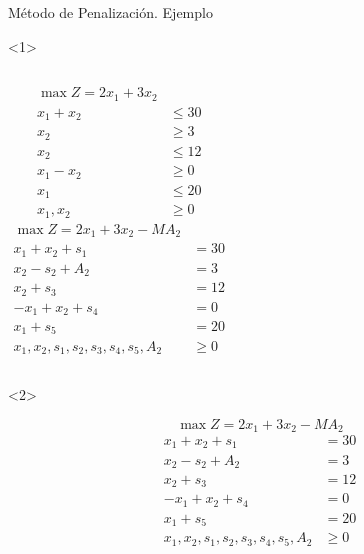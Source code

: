 \begin{frame}{Método de Penalización. Ejemplo}{}

  \begin{onlyenv}<1>
      \begin{columns}
  \begin{align*}
    \max Z = 2x_1 + 3x_2 & \\[5mm]
    x_1 + x_2 & \leq 30\\
    x_2 & \geq 3\\
    x_2 & \leq 12\\
    x_1 - x_2 & \geq 0\\
    x_1  & \leq 20 \\[5mm]
    x_1, x_2 & \geq 0
  \end{align*}
  \begin{align*}
   \max Z = 2x_1 + 3x_2 - MA_2& \\[5mm]
    x_1 + x_2 + s_1  & = 30\\
    x_2  - s_2  + A_2 &= 3\\
    x_2  + s_3 &= 12\\
    -x_1 + x_2 + s_4 & =  0\\
    x_1  + s_5& = 20 \\[5mm]
    x_1, x_2, s_1, s_2, s_3, s_4, s_5, A_2 & \geq 0
  \end{align*}
  \end{columns}
\end{onlyenv}

\begin{onlyenv}<2>

  \[ \max Z = 2x_1 + 3x_2 - MA_2 \]
      \begin{align*}
    x_1 + x_2 + s_1  & = 30\\
    x_2  - s_2  + A_2 &= 3\\
    x_2  + s_3 &= 12\\
    -x_1 + x_2 + s_4 & =  0\\
    x_1  + s_5& = 20 \\[5mm]
    x_1, x_2, s_1, s_2, s_3, s_4, s_5, A_2 & \geq 0
  \end{align*}
\end{onlyenv}
\end{frame}


